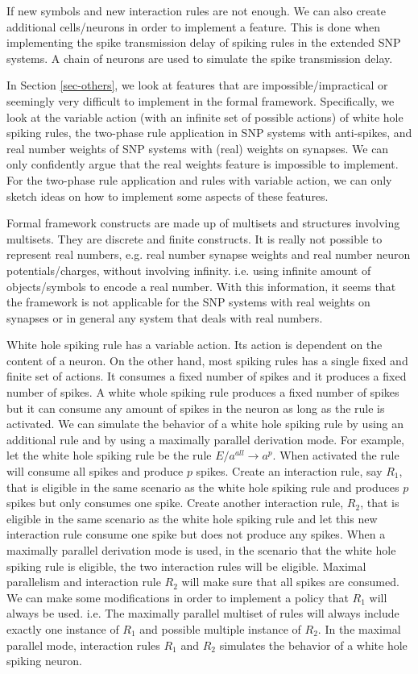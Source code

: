 \documentclass[a4paper]{article}
\theoremstyle{definition}
\newcommand{\ra}{\rightarrow}
\begin{document}
If new symbols and new interaction rules are not enough. We can also create additional cells/neurons
in order to implement a feature. This is done when implementing the spike transmission delay of
spiking rules in the extended SNP systems. A chain of neurons are used to simulate the spike
transmission delay.

In Section \ref{sec-others}, we look at features that are impossible/impractical or seemingly very
difficult to implement in the formal framework. Specifically, we look at the variable action (with
an infinite set of possible actions) of white hole spiking rules, the two-phase rule application in
SNP systems with anti-spikes, and real number weights of SNP systems with (real) weights on 
synapses. We can only confidently argue that the real weights feature is impossible to 
implement. For the two-phase rule application and rules with variable action, we can only sketch 
ideas on how to implement some aspects of these features.

Formal framework constructs are made up of multisets and structures involving multisets. They are 
discrete and finite constructs. It is really not possible to represent real numbers, e.g. real 
number synapse weights and real number neuron potentials/charges, without involving infinity. i.e. 
using infinite amount of objects/symbols to encode a real number. With this information, it seems 
that the framework is not applicable for the SNP systems with real weights on synapses or in general
any system that deals with real numbers.

White hole spiking rule has a variable action. Its action is dependent on the content of a neuron. On
the other hand, most spiking rules has a single fixed and finite set of actions. It consumes a 
fixed number of spikes and it produces a fixed number of spikes. A white whole spiking rule produces
a fixed number of spikes but it can consume any amount of spikes in the neuron as long as the rule 
is activated. We can simulate the behavior of a white hole spiking rule by using an additional rule
and by using a maximally parallel derivation mode. For example, let the white hole spiking rule be
the rule $E/a^{all} \ra a^p$. When activated the rule will consume all spikes and produce $p$ spikes.
Create an interaction rule, say $R_1$, that is eligible in the same scenario as the white hole 
spiking rule and produces $p$ spikes but only consumes one spike. Create another interaction rule,
$R_2$, that is eligible in the same scenario as the white hole spiking rule and let this new 
interaction rule consume one spike but does not produce any spikes. When a maximally parallel 
derivation mode is used, in the scenario that the white hole spiking rule is eligible, the two 
interaction rules will be eligible. Maximal parallelism and interaction rule $R_2$ will make sure
that all spikes are consumed. We can make some modifications in order to implement a policy that
$R_1$ will always be used. i.e. The maximally parallel multiset of rules will always include 
exactly one instance of $R_1$ and possible multiple instance of $R_2$. In the maximal parallel
mode, interaction rules $R_1$ and $R_2$ simulates the behavior of a white hole spiking neuron. 
\end{document}
